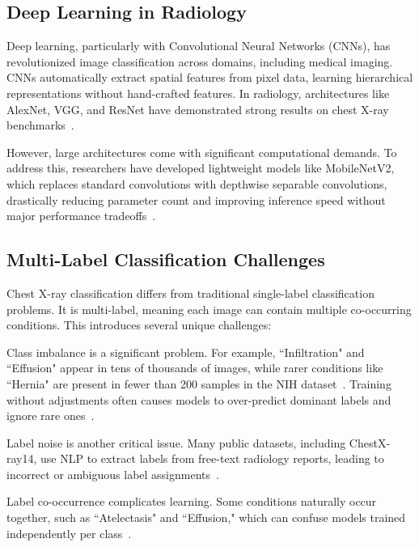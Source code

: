 \documentclass[12pt]{article}
\begin{document}
\begin{multicols}{2}
\subsection{Deep Learning in Radiology}

Deep learning, particularly with Convolutional Neural Networks (CNNs), has revolutionized image classification across domains, including medical imaging. CNNs automatically extract spatial features from pixel data, learning hierarchical representations without hand-crafted features. In radiology, architectures like AlexNet, VGG, and ResNet have demonstrated strong results on chest X-ray benchmarks~\cite{wang2017chestx, baltruschat2019comparison}.

However, large architectures come with significant computational demands. To address this, researchers have developed lightweight models like MobileNetV2, which replaces standard convolutions with depthwise separable convolutions, drastically reducing parameter count and improving inference speed without major performance tradeoffs~\cite{sandler2018mobilenetv2}.

\subsection{Multi-Label Classification Challenges}

Chest X-ray classification differs from traditional single-label classification problems. It is multi-label, meaning each image can contain multiple co-occurring conditions. This introduces several unique challenges:

Class imbalance is a significant problem. For example, ``Infiltration" and ``Effusion" appear in tens of thousands of images, while rarer conditions like ``Hernia" are present in fewer than 200 samples in the NIH dataset~\cite{wang2017chestx}. Training without adjustments often causes models to over-predict dominant labels and ignore rare ones~\cite{baltruschat2019comparison}.

Label noise is another critical issue. Many public datasets, including ChestX-ray14, use NLP to extract labels from free-text radiology reports, leading to incorrect or ambiguous label assignments~\cite{irvin2019chexpert}.

Label co-occurrence complicates learning. Some conditions naturally occur together, such as ``Atelectasis" and ``Effusion," which can confuse models trained independently per class~\cite{baltruschat2019comparison}.


\end{multicols}
\end{document}
